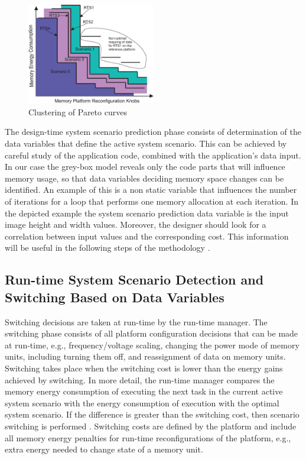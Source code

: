 \documentclass[a4paper,conference]{IEEEtran}
\begin{document}
\begin{figure}[!t]
\centering
\includegraphics[width=0.50\textwidth]{Images/2DClustering.eps}
\caption{Clustering of Pareto curves}
\label{fig:pareto}
\end{figure}

The design-time system scenario prediction phase consists of determination of the data variables that define the active system scenario. This can be achieved by careful study of the application code, combined with the application's data input. In our case the grey-box model reveals only the code parts that will influence memory usage, so that data variables deciding memory space changes can be identified. An example of this is a non static variable that influences the number of iterations for a loop that performs one memory allocation at each iteration. In the depicted example the system scenario prediction data variable is the input image height and width values. Moreover, the designer should look for a correlation between input values and the corresponding cost. This information will be useful in the following steps of the methodology \cite{tcm}.

\subsection{Run-time System Scenario Detection and Switching Based on Data Variables}

Switching decisions are taken at run-time by the run-time manager. The switching phase consists of all platform configuration decisions that can be made at run-time, e.g., frequency/voltage scaling, changing the power mode of memory units, including turning them off, and reassignment of data on memory units. Switching takes place when the switching cost is lower than the energy gains achieved by switching. In more detail, the run-time manager compares the memory energy consumption of executing the next task in the current active system scenario with the energy consumption of execution with the optimal system scenario. If the difference is greater than the switching cost, then scenario switching is performed \cite{tcm}. Switching costs are defined by the platform and include all memory energy penalties for run-time reconfigurations of the platform, e.g., extra energy needed to change state of a memory unit.
\end{document}
